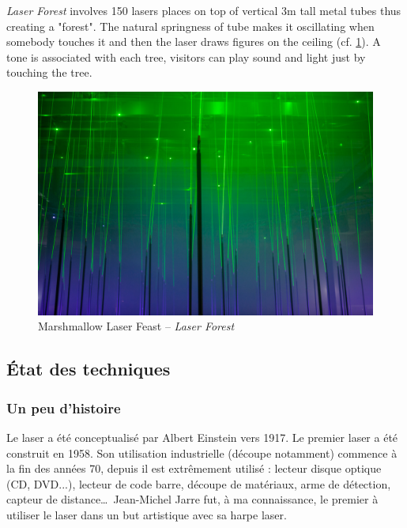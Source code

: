 \begin{en}
\textit{Laser Forest} involves 150 lasers places on top of vertical 3\unit{m} tall metal tubes thus creating a "forest".
The natural springness of tube makes it oscillating when somebody touches it and then the laser draws figures on the ceiling (cf. \ref{fig:laser_forest}).
A tone is associated with each tree, visitors can play sound and light just by touching the tree.
\end{en}

\begin{figure}[ht]
\begin{center}
\includegraphics[width=\textwidth]{images/laser_forest-7.jpg}
\end{center}
\caption{Marshmallow Laser Feast -- \textit{Laser Forest}}
\label{fig:laser_forest}
\end{figure}

\clearpage

\begin{fr}
\subsection{État des techniques}
\end{fr}

\begin{fr}
\subsubsection{Un peu d'histoire}
Le laser a été conceptualisé par Albert Einstein vers 1917.
Le premier laser a été construit en 1958.
Son utilisation industrielle (découpe notamment) commence à la fin des années 70, depuis il est extrêmement utilisé : lecteur disque optique (CD, DVD...), lecteur de code barre, découpe de matériaux, arme de détection, capteur de distance\dots\ 
Jean-Michel Jarre fut, à ma connaissance, le premier à utiliser le laser dans un but artistique avec sa harpe laser.
\end{fr}

